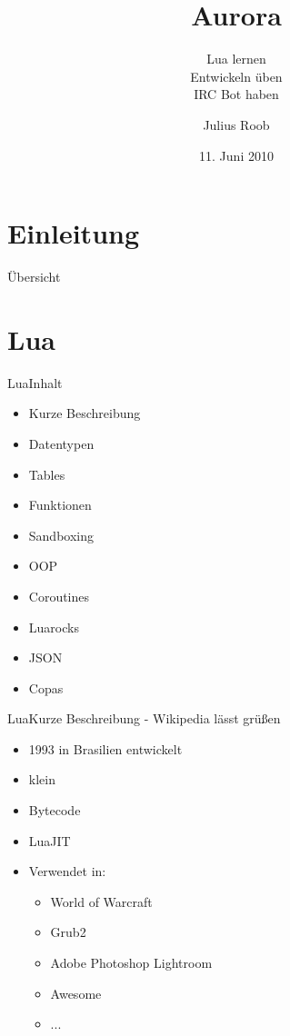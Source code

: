 \documentclass{beamer}
\author{Julius Roob}
\title{Aurora}
\subtitle{Lua lernen \checked\\Entwickeln üben \checked\\IRC Bot haben \checked}
\institute{Chaostreff Kaiserslautern}
\date{11. Juni 2010}
\begin{document}
	\section{Einleitung}
		\begin{frame}
			\titlepage
		\end{frame}
	
		\begin{frame}{Übersicht}
			\tableofcontents
		\end{frame}
	
	
	\section{Lua}
		\begin{frame}{Lua}{Inhalt}
			\begin{itemize}
				\item Kurze Beschreibung
				\item Datentypen
				\item Tables
				\item Funktionen
				\item Sandboxing
				\item OOP
				\item Coroutines
				\item Luarocks
				\item JSON
				\item Copas
			\end{itemize}
		\end{frame}

		\begin{frame}{Lua}{Kurze Beschreibung - Wikipedia lässt grüßen}
			\begin{itemize}
				\item 1993 in Brasilien entwickelt
				\item klein
				\item Bytecode
				\item LuaJIT
				\item Verwendet in:
					\begin{itemize}
						\item World of Warcraft
						\item Grub2
						\item Adobe Photoshop Lightroom
						\item Awesome
						\item ...
					\end{itemize}
			\end{itemize}
		\end{frame}
\end{document}
